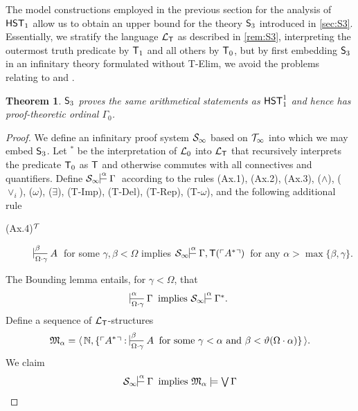 \documentclass[UKenglish,cleveref,DIV=12]{scrartcl}
\newtheorem{theorem}{Theorem}
\theoremstyle{definition}
\theoremstyle{definition}
\begin{document}
The model constructions employed in the previous section for the analysis of $\mathsf{HST}_1$
allow us to obtain an upper bound for the theory $\mathsf{S}_3$ introduced in
\cref{sec:S3}. Essentially, we stratify the language $\mathcal{L}_{\mathsf{T}}$ as described in
\cref{rem:S3}, interpreting the outermost truth predicate by $\mathsf{T}_1$ and all
others by $\mathsf{T}_0$, but by first embedding $\mathsf{S}_3$ in an infinitary theory
formulated without T-Elim, we avoid the problems relating to  and
.
\begin{theorem}\label{thm:S3strength}
 $\mathsf{S}_3$ proves the same arithmetical statements as $\mathsf{HST}_1^1$ and hence has
proof-theoretic ordinal $\Gamma_0$.
\end{theorem}
\begin{proof}
We define an infinitary proof system $\mathcal{S}_\infty$ based on $\mathcal{T}_\infty$ into
which we may embed $\mathsf{S}_3$. Let $^*$ be the interpretation of $\mathcal{L}_0$ into
$\mathcal{L}_{\mathsf{T}}$ that recursively interprets the predicate $\mathsf{T}_0$ as $\mathsf{T}$ and otherwise
commutes with all connectives and quantifiers. Define $\theoryinf
S\prov\alpha{}\Gamma$ according to the rules (Ax.1), (Ax.2), (Ax.3),
($\land$), ($\lor_i$), ($\omega$), ($\exists$), (T-Imp), (T-Del), (T-Rep), (T-$\omega$), and
the following additional rule
\begin{description}
 \item [\normalfont(Ax.4)$^{\mathcal{T}}$] $\prov\beta{\Omega\cdot\gamma} A$ for some $\gamma,\beta<\Omega$
  implies $\theoryinf S\prov\alpha{}{\Gamma,\T(\gn{A^*})}$ for any \linebreak$\alpha>\max\{\beta,\gamma\}$.
\end{description}
The Bounding lemma entails, for $\gamma<\Omega$, that
\begin{align}\label{eqn:S81}
  \prov\alpha{\Omega\cdot\gamma}\Gamma\text{ implies }\theoryinf S\prov\alpha{}{\Gamma^*.}
\end{align}
%
Define a sequence of $\mathcal{L}_{\mathsf{T}}$-structures
\begin{align*}
  \mathfrak{M}_\alpha=\pair{\N,\{\gn {A^*}:\text{$\prov{\beta}{\Omega\cdot\gamma} A$ for some $\gamma<\alpha$ and $\beta<\vartheta(\Omega\cdot\alpha)$}\}}.
\end{align*}
We claim
\begin{align}\label{eqn:S82}
  \theoryinf S\prov\alpha{}\Gamma\text{ implies }\mathfrak{M}_\alpha\models\textstyle\bigvee\Gamma
\end{align}

\end{proof}
\end{document}
